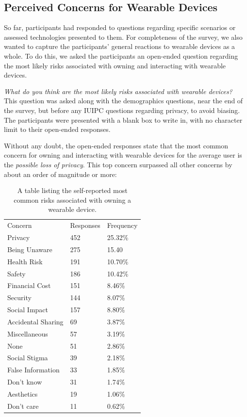 \documentclass{acm_proc_article-sp}
\begin{document}
\subsection{Perceived Concerns for Wearable Devices}
So far, participants had responded to questions regarding specific scenarios or assessed technologies presented to them. For completeness of the survey, we also wanted to capture the participants' general reactions to wearable devices as a whole. To do this, we asked the participants an open-ended question regarding the most likely risks associated with owning and interacting with wearable devices.

\textit{What do you think are the most likely risks associated with wearable devices?}\\[-.5cm]

This question was asked along with the demographics questions, near the end of the survey, but before any IUIPC questions regarding privacy, to avoid biasing. The participants were presented with a blank box to write in, with no character limit to their open-ended responses. 

Without any doubt, the open-ended responses state that the most common concern for owning and interacting with wearable devices for the average user is the \textit{possible loss of privacy}. This top concern surpassed all other concerns by about an order of magnitude or more:

\begin{table}[h]
\begin{center}
\begin{tabular}{lll}

Concern &  Responses &  Frequency &   \\
Privacy & 452 & 25.32\% \\
Being Unaware & 275 & 15.40\ \\
Health Risk & 191 & 10.70\%\\
Safety & 186 & 10.42\%\\
Financial Cost & 151 & 8.46\%\\
Security &	144 & 8.07\%\\
Social Impact &	157 & 8.80\%\\
Accidental Sharing &	69 & 3.87\%\\
Miscellaneous &	57 & 3.19\%\\
None	& 51 & 2.86\%\\
Social Stigma &	39 & 2.18\%\\
False Information & 33 & 1.85\%\\
Don't know & 31 & 1.74\%\\
Aesthetics 	& 19 & 1.06\%\\
Don't care 	& 11 & 0.62\%\\

\end{tabular}
\caption{A table listing the self-reported most common risks associated with owning a wearable device.}
\label{open-responses}
\end{center}
\end{table}
\end{document}
